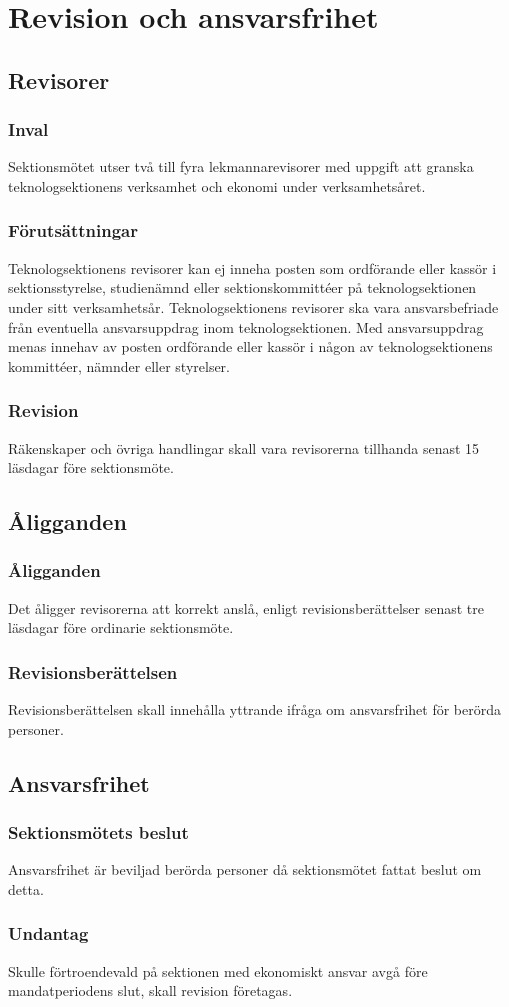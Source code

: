 \section{Revision och ansvarsfrihet}

\subsection{Revisorer}

\subsubsection{Inval}
Sektionsmötet utser två till fyra lekmannarevisorer med uppgift att granska teknologsektionens verksamhet och ekonomi under verksamhetsåret.

\subsubsection{Förutsättningar}
Teknologsektionens revisorer kan ej inneha posten som ordförande eller kassör i sektionsstyrelse, studienämnd eller sektionskommittéer på teknologsektionen under sitt verksamhetsår. Teknologsektionens revisorer ska vara ansvarsbefriade från eventuella ansvarsuppdrag inom teknologsektionen. Med ansvarsuppdrag menas innehav av posten ordförande eller kassör i någon av teknologsektionens kommittéer, nämnder eller styrelser.

\subsubsection{Revision}
Räkenskaper och övriga handlingar skall vara revisorerna tillhanda senast 15 läsdagar före sektionsmöte.

\subsection{Åligganden}

\subsubsection{Åligganden}
Det åligger revisorerna att korrekt anslå, enligt revisionsberättelser senast tre läsdagar före ordinarie sektionsmöte.

\subsubsection{Revisionsberättelsen}
Revisionsberättelsen skall innehålla yttrande ifråga om ansvarsfrihet för berörda personer.

\subsection{Ansvarsfrihet}

\subsubsection{Sektionsmötets beslut}
Ansvarsfrihet är beviljad berörda personer då sektionsmötet fattat beslut om detta.

\subsubsection{Undantag}
Skulle förtroendevald på sektionen med ekonomiskt ansvar avgå före mandatperiodens slut, skall revision företagas.
